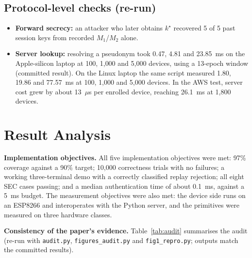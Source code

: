 \documentclass[12pt,a4paper,oneside]{report}
\numberwithin{equation}{chapter}
\begin{document}
\subsection*{Protocol-level checks (re-run)}
\begin{itemize}[nosep]
  \item \textbf{Forward secrecy:} an attacker who later obtains $k^\star$ recovered 5 of 5 past session keys from recorded $M_1$/$M_2$ alone.
  \item \textbf{Server lookup:} resolving a pseudonym took 0.47, 4.81 and 23.85~ms on the Apple-silicon laptop at 100, 1{,}000 and 5{,}000 devices, using a 13-epoch window (committed result). On the Linux laptop the same script measured 1.80, 19.86 and 77.57~ms at 100, 1{,}000 and 5{,}000 devices. In the AWS test, server cost grew by about 13~$\mu$s per enrolled device, reaching 26.1~ms at 1{,}800 devices.
\end{itemize}

\section{Result Analysis}
\textbf{Implementation objectives.} All five implementation objectives were met: 97\% coverage against a 90\% target; 10{,}000 correctness trials with no failures; a working three-terminal demo with a correctly classified replay rejection; all eight SEC cases passing; and a median authentication time of about 0.1~ms, against a 5~ms budget. The measurement objectives were also met: the device side runs on an ESP8266 and interoperates with the Python server, and the primitives were measured on three hardware classes.

\textbf{Consistency of the paper's evidence.} Table~\ref{tab:audit} summarises the audit (re-run with \texttt{audit.py}, \texttt{figures\_audit.py} and \texttt{fig1\_repro.py}; outputs match the committed results).
\end{document}
